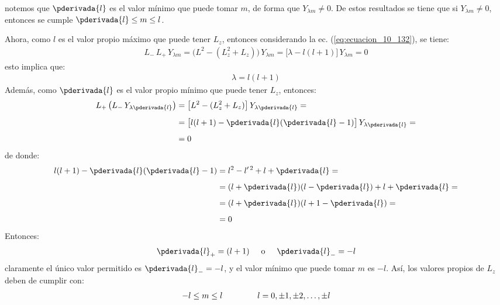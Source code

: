notemos que $\pderivada{l}$ es el valor mínimo que puede tomar $m$, de forma que $Y_{\lambda m} \neq 0$. De estos resultados se tiene que si $Y_{\lambda m} \neq 0$, entonces se cumple $\pderivada{l} \leq m \leq l$.
\par
Ahora, como $l$ es el valor propio máximo que puede tener $L_{z}$, entonces considerando la ec. (\ref{eq:ecuacion_10_132}), se tiene:
\begin{align}
L_{-} \, L_{+} \, Y_{\lambda m} = \big( L^{2} - (L_{z}^{2} + L_{z}) \big) \, Y_{\lambda m} = \big[ \lambda - l (l + 1) \big] \, Y_{\lambda m} = 0
\end{align}
esto implica que:
\begin{align*}
\lambda = l (l + 1)
\end{align*}
Además, como $\pderivada{l}$ es el valor propio mínimo que puede tener $L_{z}$, entonces:
\begin{align*}
L_{+} \, \big( L_{-} \, Y_{\lambda \pderivada{l}} \big) &= \big[ L^{2} - (L_{z}^{2} + L_{z}) \big] \, Y_{\lambda \pderivada{l}} = \\[0.5em]
&= \big[ l (l + 1) - \pderivada{l} (\pderivada{l} - 1) \big] \, Y_{\lambda \pderivada{l}} = \\[0.5em]
&= 0
\end{align*}
de donde:
\begin{align}
\begin{aligned}[b]
l (l + 1) - \pderivada{l} (\pderivada{l} - 1) &= l^{2} - l^{\prime \, 2} + l + \pderivada{l} = \\[0.5em]
&= (l + \pderivada{l})(l - \pderivada{l}) + l + \pderivada{l} = \\[0.5em]
&= (l + \pderivada{l})(l + 1 - \pderivada{l}) = \\[0.5em]
&= 0
\end{aligned}
\label{eq:ecuacion_10_148}
\end{align}
Entonces:
\begin{align}
\pderivada{l}_{+} = (l + 1) \hspace{0.5cm} \mbox{o} \hspace{0.5cm} \pderivada{l}_{-} = - l
\label{eq:ecuacion_10_149}
\end{align}
claramente el único valor permitido es $\pderivada{l}_{-} = - l$, y el valor mínimo que puede tomar $m$ es $-l$. Así, los valores propios de $L_{z}$ deben de cumplir con:
\begin{align}
-l \leq m \leq l \hspace{1.5cm} l = 0, \pm 1, \pm 2, \ldots, \pm l
\label{eq:ecuacion_10_150}
\end{align}


